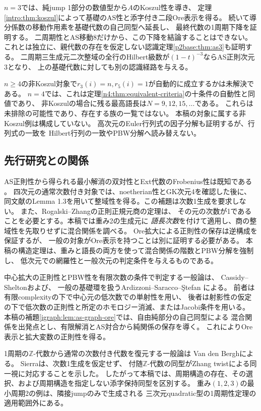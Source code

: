 \documentclass[11pt,a4paper]{ltjsarticle}
\theoremstyle{definition}
\begin{document}
$n=3$では、純jump 1部分の数値型から$A$のKoszul性を導き、
定理\ref{intro:thm:koszul}によって基礎のAS性と添字付き二段Ore表示を得る。
続いて導分係数の移動作用素を基礎代数の自己同型へ延長し、
最終代数の1周期下降を証明する。
二周期性とAS移動8だけから、この下降を結論することはできない。
これとは独立に、親代数の存在を仮定しない認識定理\ref{p2base:thm:as3}も証明する。
二周期三生成元二次整域の全行のHilbert級数が$(1-t)^{-3}$ならAS正則次元3となり、
上の基礎代数に対しても別の認識経路を与える。

$n\ge4$の非Koszul対象で$r_3(i)=n,r_5(i)=1$が自動的に成立するかは未解決である。
$n=4$では、これは定理\ref{n4:thm:equivalent-criteria}の十条件の自動性と同値であり、
非Koszulの場合に残る最高語長は$N=9,12,15,\ldots$である。
これらは未排除の可能性であり、存在する族の一覧ではない。
本稿の対象に属する非Koszul例は構成していない。
高次元のEuler行列式の因子分解も証明するが、行列式の一致を
Hilbert行列の一致やPBW分解へ読み替えない。

\subsection{先行研究との関係}
AS正則性から得られる最小解消の双対性とExt代数のFrobenius性は既知である
\cite[Lemma 1.1, Theorem 1.9]{LPWZ}。
四次元の通常次数付き対象では、noetherian性とGK次元4を確認した後に、
同文献のLemma 1.3を用いて整域性を得る。この補題は次数1生成を要求しない。
また、Rogalski--Zhang\cite[Lemma 1.1]{RZ}の正則正規元商の定理は、
その元の次数が1であることを必要とする。本稿では重み2の生成元に
\emph{語長次数}を付けて適用し、商の整域性を先取りせずに混合関係を調べる。
Ore拡大による正則性の保存\cite[Theorem 3.3]{LWW}は逆構成を保証するが、
一般の対象がOre表示を持つことは別に証明する必要がある。
本稿の構造定理は、重みと語長の両方を使って混合関係の階数とPBW分解を強制し、
低次元での網羅性と一般次元の判定条件を与えるものである。

中心拡大の正則性とPBW性を有限次数の条件で判定する一般論は、
Cassidy--Shelton\cite[Theorems 1.5, 3.6]{CSPBW}および、
一般の基礎環を扱うArdizzoni--Saracco--\c{S}tefan
\cite[Theorems 3.14, 5.5]{ASSPBW}による。
前者は有限complexityの下で中心元の低次数での単射性を用い、
後者は射影性の仮定の下で低次数の正則性と所定のホモロジー消滅、またはJacobi条件を用いる。
本稿の補題\ref{igraph:lem:as-graph-ore}では、自由純部分の自己同型による
混合関係を出発点とし、有限解消とAS対合から純関係の保存を導く。
これによりOre表示と拡大変数の正則性を得る。

1周期の$\mathbb Z$-代数から通常の次数付き代数を復元する一般論は
Van den Bergh\cite[Lemma 3.4]{VdB}による。
Sierra\cite[Theorem 1.2 = Corollary 4.4]{Sierra}は、次数1生成を仮定せず、
付随$\mathbb Z$-代数の同型がZhang twistによる同一視に対応することを示した。
したがって本稿では、周期構造の存在、その選択、および周期構造を指定しない添字保持同型を区別する。
重み$(1,2,3)$の最小周期2の例は、隣接jumpのみで生成される
三次元quadratic型の1周期性定理\cite[Definition 4.1.1, Theorem 4.2.2]{VdB}の適用範囲外にある。
\end{document}
